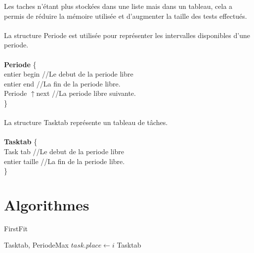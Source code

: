 \documentclass[11pt]{article}
\begin{document}
\noindent Les taches n'étant plus stockées dans une liste mais dans un tableau, cela a permis de réduire la mémoire utilisée et d'augmenter la taille des tests effectués.\\\\
La structure Periode est utilisée pour représenter les intervalles disponibles d'une periode.\\\\
\indent \textbf{Periode} \{ \\
    \indent \indent entier begin    \indent \indent//Le debut de la periode libre\\
    \indent \indent entier end \indent \indent //La fin de la periode libre.\\
    \indent \indent Periode $\uparrow$next \indent //La periode libre suivante.\\
\indent\}
\\\\
La structure Tasktab représente un tableau de tâches.\\\\
\indent \textbf{Tasktab} \{ \\
    \indent \indent Task tab    \indent \indent//Le debut de la periode libre\\
    \indent \indent entier taille \indent   //La fin de la periode libre.\\
\indent\}

\section{Algorithmes}

\begin{algorithm}
    \caption{FirstFit}
    \begin{algorithmic}
    \REQUIRE Tasktab, PeriodeMax
            \STATE $task.place \leftarrow i$
         \ENDIF
        \ENDFOR
    \ENDFOR
    \RETURN Tasktab
    \end{algorithmic}
\end{algorithm}
\end{document}
